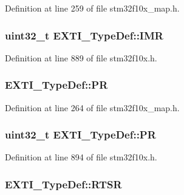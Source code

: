 Definition at line 259 of file stm32f10x\+\_\+map.\+h.

\subsubsection[{\texorpdfstring{I\+MR}{IMR}}]{ {\bf uint32\+\_\+t} E\+X\+T\+I\+\_\+\+Type\+Def\+::\+I\+MR}\hypertarget{struct_e_x_t_i___type_def_a17d061db586d4a5aa646b68495a8e6a4}{}\label{struct_e_x_t_i___type_def_a17d061db586d4a5aa646b68495a8e6a4}


Definition at line 889 of file stm32f10x.\+h.

\subsubsection[{\texorpdfstring{PR}{PR}}]{ E\+X\+T\+I\+\_\+\+Type\+Def\+::\+PR}\hypertarget{struct_e_x_t_i___type_def_a1f77bea5b9848f45f2c77095a4db92dd}{}\label{struct_e_x_t_i___type_def_a1f77bea5b9848f45f2c77095a4db92dd}


Definition at line 264 of file stm32f10x\+\_\+map.\+h.

\subsubsection[{\texorpdfstring{PR}{PR}}]{ {\bf uint32\+\_\+t} E\+X\+T\+I\+\_\+\+Type\+Def\+::\+PR}\hypertarget{struct_e_x_t_i___type_def_a133294b87dbe6a01e8d9584338abc39a}{}\label{struct_e_x_t_i___type_def_a133294b87dbe6a01e8d9584338abc39a}


Definition at line 894 of file stm32f10x.\+h.

\subsubsection[{\texorpdfstring{R\+T\+SR}{RTSR}}]{ E\+X\+T\+I\+\_\+\+Type\+Def\+::\+R\+T\+SR}\hypertarget{struct_e_x_t_i___type_def_a4c6651ca0f67b776fc82124489137a25}{}\label{struct_e_x_t_i___type_def_a4c6651ca0f67b776fc82124489137a25}


